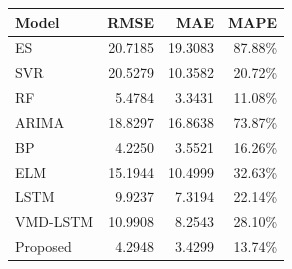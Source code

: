 {\tiny\setlength{\tabcolsep}{2pt}\begin{tabular}{lrrr} \toprule
Model & RMSE & MAE & MAPE \\ \midrule
ES & 20.7185 & 19.3083 & 87.88\% \\ 
SVR & 20.5279 & 10.3582 & 20.72\% \\ 
RF & 5.4784 & 3.3431 & 11.08\% \\ 
ARIMA & 18.8297 & 16.8638 & 73.87\% \\ 
BP & 4.2250 & 3.5521 & 16.26\% \\ 
ELM & 15.1944 & 10.4999 & 32.63\% \\ 
LSTM & 9.9237 & 7.3194 & 22.14\% \\ 
VMD-LSTM & 10.9908 & 8.2543 & 28.10\% \\ 
Proposed & 4.2948 & 3.4299 & 13.74\% \\ 
\bottomrule \end{tabular}}